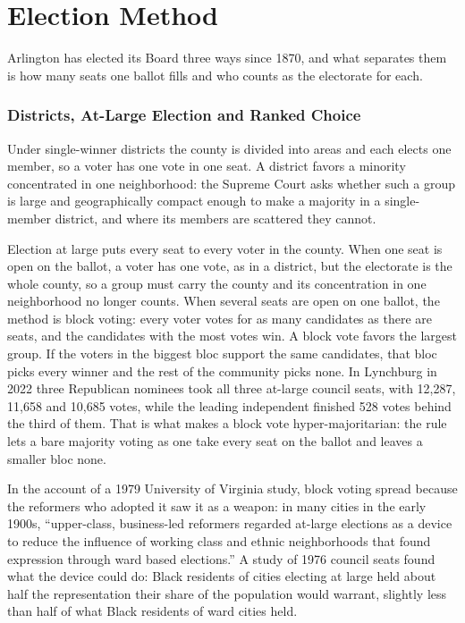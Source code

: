 \section{Election Method}\label{sec:method}

Arlington has elected its Board three ways since 1870, and what separates them is
how many seats one ballot fills and who counts as the electorate for each.

\subsubsection{Districts, At-Large Election and Ranked Choice}

Under single-winner districts the county is divided into areas and each elects one
member, so a voter has one vote in one seat. A district favors a minority
concentrated in one neighborhood: the Supreme Court asks whether such a group is
large and geographically compact enough to make a majority in a single-member
district, and where its members are scattered they cannot.\autocite[50]{thornburgvgingles1986}

Election at large puts every seat to every voter in the county. When one seat is
open on the ballot, a voter has one vote, as in a district, but the electorate is
the whole county, so a group must carry the county and its concentration in one
neighborhood no longer counts. When several seats are open on one ballot, the
method is block voting: every voter votes for as many candidates as there are seats,
and the candidates with the most votes win.\autocite{arlingtonboard2026rcv} A block vote
favors the largest group. If the voters in the biggest bloc support the same
candidates, that bloc picks every winner and the rest of the community picks none.
In Lynchburg in 2022 three Republican nominees took all three at-large council
seats, with 12,287, 11,658 and 10,685 votes, while the leading independent finished
528 votes behind the third of them.\autocite[contest 156756]{vaelections}\fnsep\autocite[48--49]{thornburgvgingles1986}
That is what makes a block vote hyper-majoritarian: the rule lets a bare majority
voting as one take every seat on the ballot and leaves a smaller bloc none.

In the account of a 1979 University of Virginia study, block voting spread because
the reformers who adopted it saw it as a weapon: in many cities in the early 1900s,
``upper-class, business-led reformers regarded at-large elections as a device to
reduce the influence of working class and ethnic neighborhoods that found
expression through ward based elections.''\autocite{orourke1979atlarge}
A study of 1976 council seats found what the device could do: Black residents of
cities electing at large held about half the representation their share of the
population would warrant, slightly less than half of what Black residents of ward
cities held.\autocite[122]{berry1979atlarge}

